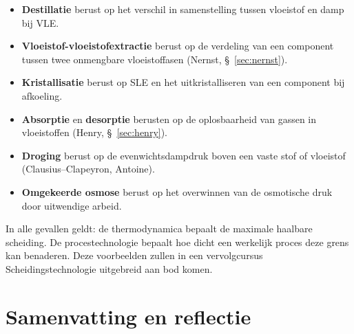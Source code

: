 \begin{itemize}
\item \textbf{Destillatie} berust op het verschil in samenstelling tussen vloeistof en damp bij VLE.
\item \textbf{Vloeistof-vloeistofextractie} berust op de verdeling van een component tussen twee onmengbare vloeistoffasen (Nernst, \S~\ref{sec:nernst}).
\item \textbf{Kristallisatie} berust op SLE en het uitkristalliseren van een component bij afkoeling.
\item \textbf{Absorptie} en \textbf{desorptie} berusten op de oplosbaarheid van gassen in vloeistoffen (Henry, \S~\ref{sec:henry}).
\item \textbf{Droging} berust op de evenwichtsdampdruk boven een vaste stof of vloeistof (Clausius--Clapeyron, Antoine).
\item \textbf{Omgekeerde osmose} berust op het overwinnen van de osmotische druk door uitwendige arbeid.
\end{itemize}

In alle gevallen geldt: de thermodynamica bepaalt de maximale haalbare scheiding. De procestechnologie bepaalt hoe dicht een werkelijk proces deze grens kan benaderen. Deze voorbeelden zullen in een vervolgcursus Scheidingstechnologie uitgebreid aan bod komen.

\section{Samenvatting en reflectie}


